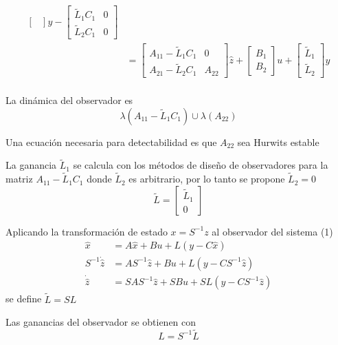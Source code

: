 \[\begin{split}
\begin{bmatrix}
        \end{bmatrix} y -
        \begin{bmatrix}
            \tilde{L}_{1}C_{1} & 0 \\
            \tilde{L}_{2}C_{1} & 0
        \end{bmatrix} \\
        & = 
        \begin{bmatrix}
            A_{11}-\tilde{L}_{1}C_{1} & 0 \\
            A_{21}-\tilde{L}_{2}C_{1} & A_{22}
        \end{bmatrix} \hat{z} +
        \begin{bmatrix}
            B_{1} \\ B_{2}
        \end{bmatrix} u
        +
        \begin{bmatrix}
            \tilde{L}_{1} \\ \tilde{L}_{2}
        \end{bmatrix} y \\
    \end{split}
\]

La dinámica del observador es
\[
    \lambda(A_{11} - \tilde{L}_{1}C_{1}) \cup \lambda(A_{22})
\]

Una ecuación necesaria para detectabilidad es que \( A_{22} \) sea Hurwits estable

La ganancia \( \tilde{L}_{1} \) se calcula con los métodos de diseño de observadores para la matriz \( A_{11}-\tilde{L}_{1}C_{1} \) donde \( \tilde{L}_{2} \) es arbitrario, por lo tanto se propone \( \tilde{L}_{2} = 0 \)
\[
    \tilde{L} = 
    \begin{bmatrix}
        \tilde{L}_{1} \\ 0    
    \end{bmatrix}
\]

Aplicando la transformación de estado \( x = S^{-1}z \) al observador del sistema (1) 
\[
    \begin{split}
        \hat{x} & = A\hat{x} + Bu + L(y-C\hat{x}) \\
        S^{-1}\dot{\hat{z}} & = AS^{-1}\hat{z} + Bu + L(y-CS^{-1}\hat{z}) \\
        \dot{\hat{z}} & = SAS^{-1}\hat{z} + SBu + SL (y-CS^{-1}\hat{z})
    \end{split}
\]
se define \( \tilde{L} = SL \)

Las ganancias del observador se obtienen con 
\[
    L = S^{-1}\tilde{L}
\]